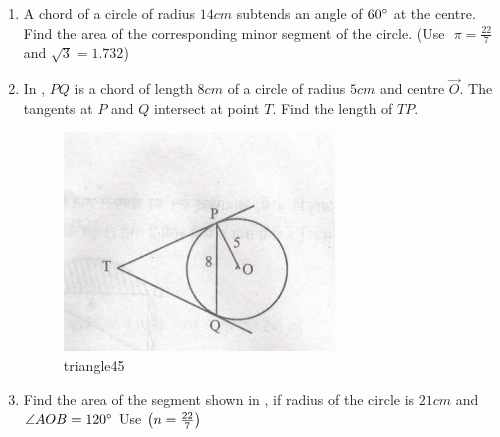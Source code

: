 \begin{enumerate}
\item A chord of a circle of radius $14 cm$ subtends an angle of $60\degree$ at the centre. Find the area of the corresponding minor segment of the circle.
({Use $\hspace{4pt}\pi=\frac{22}{7}$ and $\sqrt{3} = 1.732$})



\item In , $PQ$ is a chord of length $8 cm$ of a circle of radius $5 cm$ and centre $\vec{O}$. The tangents at $P$ and $Q$ intersect at point $T$. Find the length of $TP$.
\begin{figure}[H]                                             \centering
         \includegraphics[width=\columnwidth]{figs/i2.jpeg}
			\caption{triangle45}
			\label{fig:figure2345}

                \end{figure}
\item Find the area of the segment shown in , if radius of the circle is $21 cm$ and $\angle AOB = 120\degree$ Use $\left(n =\frac{22}{7}\right) $
\begin{figure}[H]                                     
\centering
	

\end{figure}
\end{enumerate}
